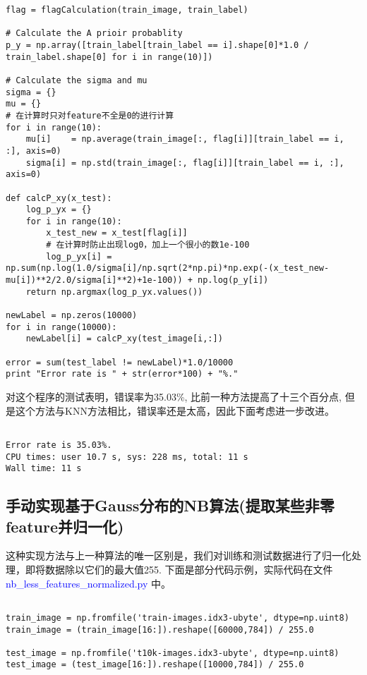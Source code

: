 \documentclass[a4paper, 1pt]{article}
\begin{document}
\begin{spacing}{1.2}
\begin{lstlisting}
flag = flagCalculation(train_image, train_label)

# Calculate the A prioir probablity
p_y = np.array([train_label[train_label == i].shape[0]*1.0 / train_label.shape[0] for i in range(10)])

# Calculate the sigma and mu
sigma = {}
mu = {}
# 在计算时只对feature不全是0的进行计算
for i in range(10):
    mu[i]    = np.average(train_image[:, flag[i]][train_label == i, :], axis=0)
    sigma[i] = np.std(train_image[:, flag[i]][train_label == i, :], axis=0)

def calcP_xy(x_test):
    log_p_yx = {}
    for i in range(10):
        x_test_new = x_test[flag[i]]
        # 在计算时防止出现log0，加上一个很小的数1e-100
        log_p_yx[i] = np.sum(np.log(1.0/sigma[i]/np.sqrt(2*np.pi)*np.exp(-(x_test_new-mu[i])**2/2.0/sigma[i]**2)+1e-100)) + np.log(p_y[i])
    return np.argmax(log_p_yx.values())

newLabel = np.zeros(10000)
for i in range(10000):
    newLabel[i] = calcP_xy(test_image[i,:])

error = sum(test_label != newLabel)*1.0/10000
print "Error rate is " + str(error*100) + "%."
\end{lstlisting}

对这个程序的测试表明，错误率为35.03\%, 比前一种方法提高了十三个百分点, 但是这个方法与KNN方法相比，错误率还是太高，因此下面考虑进一步改进。
\begin{lstlisting}

Error rate is 35.03%.
CPU times: user 10.7 s, sys: 228 ms, total: 11 s
Wall time: 11 s
\end{lstlisting}

\subsection{手动实现基于Gauss分布的NB算法(提取某些非零feature并归一化)}
这种实现方法与上一种算法的唯一区别是，我们对训练和测试数据进行了归一化处理，即将数据除以它们的最大值255. 下面是部分代码示例，实际代码在文件 \textcolor{blue}{ nb\_less\_features\_normalized.py} 中。
\begin{lstlisting}

train_image = np.fromfile('train-images.idx3-ubyte', dtype=np.uint8)
train_image = (train_image[16:]).reshape([60000,784]) / 255.0

test_image = np.fromfile('t10k-images.idx3-ubyte', dtype=np.uint8)
test_image = (test_image[16:]).reshape([10000,784]) / 255.0
\end{lstlisting}


\end{spacing}
\end{document}
